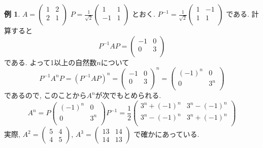 \documentclass[dvipdfmx,a4paper,11pt]{article}
\theoremstyle{definition}
\newtheorem{exa}[thm]{例}
\begin{document}
\begin{exa}
  $
A = \begin{pmatrix} %
1 & 2\\
2 & 1\\
 \end{pmatrix}
 $
 $
P =\frac{1}{\sqrt{2}} 
\begin{pmatrix} %
1& 1\\
-1 & 1\\
 \end{pmatrix}
 $
 とおく.
 $P^{-1} = \frac{1}{\sqrt{2}} 
\begin{pmatrix}
1& -1\\
1 & 1\\
 \end{pmatrix}
 $
 である. 計算すると
 $$
 P^{-1} A P=
 \begin{pmatrix}
-1& 0 \\
0& 3\\
\end{pmatrix}
 $$
である. よって1以上の自然数$n$について
$$
P^{-1} A^n P 
= 
(P^{-1} A P )^n
=
 \begin{pmatrix}
-1& 0 \\
0& 3\\
\end{pmatrix}^n
=
 \begin{pmatrix}
(-1)^n& 0 \\
0& 3^n\\
\end{pmatrix}
$$
であるので, このことから$A^n$が次でもとめられる.
$$
A^n = 
P
 \begin{pmatrix}
(-1)^n& 0 \\
0& 3^n\\
\end{pmatrix}
P^{-1}
=\frac{1}{2}
\begin{pmatrix}
3^n + (-1)^n& 3^n - (-1)^n\\
3^n - (-1)^n& 3^n + (-1)^n\\
\end{pmatrix}
$$
実際, $
 A^2
 =  
 \begin{pmatrix}
5& 4\\
4 & 5
 \end{pmatrix}
 $,  $
 A^3
 =  
 \begin{pmatrix}
13& 14\\
14 & 13
 \end{pmatrix}
 $
 で確かにあっている. 
 
\end{exa}
\end{document}
